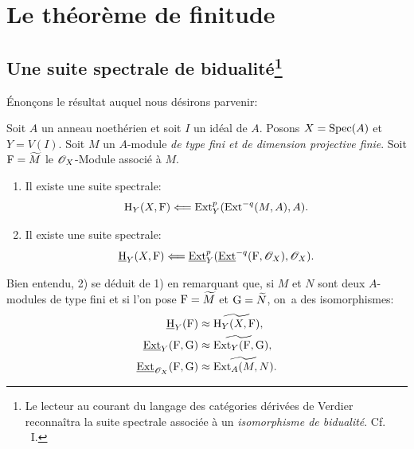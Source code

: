 \chapter{Le th\'eor\`eme de finitude} \label{VIII}

\section[Une suite spectrale de bidualit\'e]
{Une suite spectrale de bidualit\'e\footnote{Le lecteur au courant du
langage des cat\'egories d\'eriv\'ees de Verdier reconna\^itra la suite
spectrale associ\'ee \`a un \emph{isomorphisme de bidualité}. Cf. ~I.}}\label{VIII.1}

\renewcommand{\theequation}{\thesection.\arabic{equation}}

\'Enon\c cons le r\'esultat auquel nous d\'esirons parvenir:

\begin{proposition} \label{VIII.1.1} Soit $A$ un anneau noeth\'erien et soit $I$ un id\'eal de $A$. Posons $X=\operatorname{Spec}(A)$ et $Y=V(I)$. Soit $M$ un $A$-module \emph{de type fini et de dimension projective finie}. Soit ${\operatorname{F}}=\widetilde{M}$ le $\mathscr{O}_X$-Module associ\'e \`a $M$.
\begin{enumerate}
\item[\textup{1)}] Il existe une suite spectrale:
\[
\operatorname{H}_Y(X, {\operatorname{F}}) \Longleftarrow \operatorname{Ext}^p_Y(\operatorname{Ext}^{-q}(M, A), A).
\]

\item[\textup{2)}] Il existe une suite spectrale:
\[
\mathop{\underline{\mathrm{H}}}\nolimits_Y(X, {\operatorname{F}}) \Longleftarrow \mathop{\underline{\mathrm{Ext}}}\nolimits^p_Y(\mathop{\underline{\mathrm{Ext}}}\nolimits^{-q}({\operatorname{F}}, \mathscr{O}_X), \mathscr{O}_X).
\]
\end{enumerate}
\end{proposition}

Bien entendu, 2) se d\'eduit de 1) en remarquant que, si $M$ et $N$ sont deux $A$-modules de type fini et si l'on pose ${{\operatorname{F}}}=\widetilde{M}$ et ${{\operatorname{G}}}=\widetilde{N}$, on~a des isomorphismes:
\begin{align*}
\mathop{\underline{\mathrm{H}}}\nolimits_Y({\operatorname{F}}) &\approx \widetilde{\operatorname{H}_Y(X, {\operatorname{F}})}, \\
\mathop{\underline{\mathrm{Ext}}}\nolimits_Y({\operatorname{F}}, {\operatorname{G}}) &\approx \widetilde{\operatorname{Ext}_Y({\operatorname{F}}, {\operatorname{G}}}), \\
\mathop{\underline{\mathrm{Ext}}}\nolimits_{\mathscr{O}_X}({\operatorname{F}}, {\operatorname{G}}) &\approx \widetilde{\operatorname{Ext}_A(M, N)}.
\end{align*}

